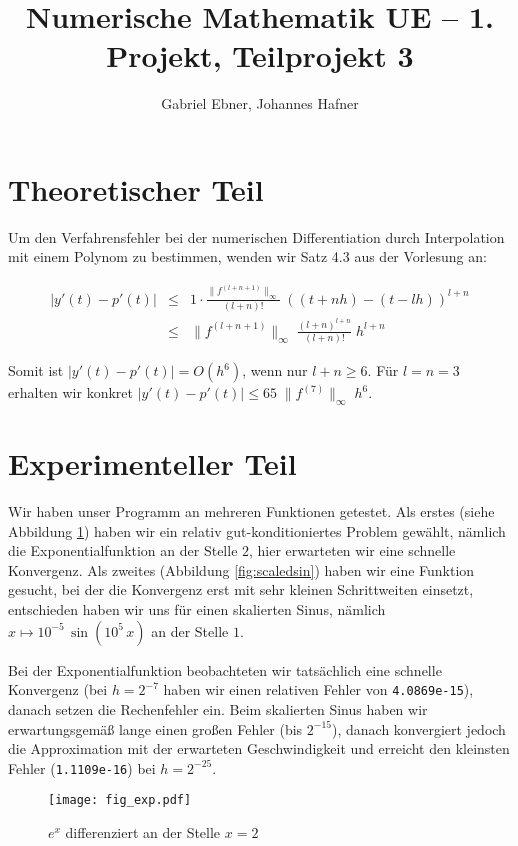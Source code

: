 \documentclass{scrartcl}
\begin{document}
\title{Numerische Mathematik UE -- 1. Projekt, Teilprojekt 3}
\author{Gabriel Ebner, Johannes Hafner}
\maketitle

\section{Theoretischer Teil}

Um den Verfahrensfehler bei der numerischen Differentiation durch Interpolation mit einem
Polynom zu bestimmen, wenden wir Satz 4.3 aus der Vorlesung an:

\begin{eqnarray*}
|y'(t) - p'(t)| &\leq& 1 \cdot
    \frac{\|f^{(l+n+1)}\|_\infty}{(l+n)!}\; ((t+nh) - (t-lh))^{l+n} \\
  &\leq& \|f^{(l+n+1)}\|_\infty\; \frac{(l+n)^{l+n}}{(l+n)!}\; h^{l+n}
\end{eqnarray*}

Somit ist \(|y'(t)-p'(t)| = O(h^6)\), wenn nur \(l+n \geq 6\).  Für \(l=n=3\)
erhalten wir konkret \(|y'(t)-p'(t)| \leq 65\; \|f^{(7)}\|_\infty\; h^6\).

\section{Experimenteller Teil}

Wir haben unser Programm an mehreren Funktionen getestet.  Als erstes (siehe
Abbildung \ref{fig:exp}) haben wir ein relativ gut-konditioniertes Problem gewählt,
nämlich die Exponentialfunktion an der Stelle \(2\), hier erwarteten wir eine
schnelle Konvergenz.  Als zweites (Abbildung \ref{fig:scaledsin}) haben wir eine Funktion
gesucht, bei der die Konvergenz erst mit sehr kleinen Schrittweiten einsetzt,
entschieden haben wir uns für einen skalierten Sinus, nämlich \(x \mapsto
10^{-5}\, \sin(10^5\, x)\) an der Stelle \(1\).

Bei der Exponentialfunktion beobachteten wir tatsächlich eine schnelle
Konvergenz (bei \(h=2^{-7}\) haben wir einen relativen Fehler von
\verb|4.0869e-15|), danach setzen die Rechenfehler ein.  Beim skalierten Sinus
haben wir erwartungsgemäß lange einen großen Fehler (bis \(2^{-15}\)), danach
konvergiert jedoch die Approximation mit der erwarteten Geschwindig\-keit und
erreicht den kleinsten Fehler (\verb|1.1109e-16|) bei \(h=2^{-25}\).

\begin{figure}[!htb]
\centering
\texttt{[image: fig\_exp.pdf]}
\caption{\(e^x\) differenziert an der Stelle \(x=2\)}
\label{fig:exp}
\end{figure}
\end{document}
